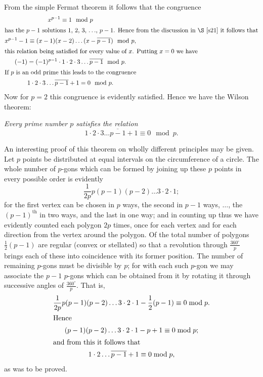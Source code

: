 \documentclass[oneside]{book}
\begin{document}
From the simple Fermat theorem it follows that the congruence
\begin{gather*}
x^{p-1} \equiv 1\mod p \\
\intertext{has the $p-1$ solutions $1$, $2$, $3$, $\ldots$, $p-1$.
Hence from the discussion in \S \ref{s21} it follows that}
x^{p-1}-1 \equiv (x-1)(x-2)\ldots(x-\overline{p-1}) \mod p, \\
\intertext{this relation being satisfied for every value of $x$.
Putting $x = 0$ we have}
(-1) = (-1)^{p - 1}\cdot 1\cdot 2\cdot 3 \ldots
           \overline{p-1}\mod p.  \\
\intertext{If $p$ is an odd prime this leads to the congruence}
1 \cdot 2 \cdot 3 \ldots \overline{p-1} + 1 = 0 \mod p.
\end{gather*}
Now for $p = 2$ this congruence is evidently satisfied. Hence
we have the Wilson theorem:

\smallskip \emph{Every prime number $p$ satisfies the relation}
\begin{equation*}
1 \cdot 2 \cdot 3 \ldots \overline{p-1} + 1 \equiv 0 \mod p.
\end{equation*}

An interesting proof of this theorem on wholly different principles
may be given. Let $p$ points be distributed at equal intervals on
the circumference of a circle. The whole number of $p$-gons which
can be formed by joining up these $p$ points in every possible order
is evidently
\begin{equation*}
\frac{1}{2p} p (p-1) (p-2) \ldots 3 \cdot 2 \cdot 1;
\end{equation*}
for the first vertex can be chosen in $p$ ways, the second in $p -
1$ ways, $\ldots$, the $(p-1)^{\mathrm{th}}$ in two ways, and the
last in one way; and in counting up thus we have evidently counted
each polygon $2p$ times, once for each vertex and for each direction
from the vertex around the polygon. Of the total number of polygons
$\frac{1}{2}(p-1)$ are regular (convex or stellated) so that a
revolution through $\frac{360^\circ}{p}$ brings each of these into
coincidence with its former position. The number of remaining
$p$-gons must be divisible by $p$; for with each such $p$-gon we may
associate the $p-1$ $p$-gons which can be obtained from it by
rotating it through successive angles of $\frac{360^\circ}{p}$. That
is,
\begin{gather*}
\frac{1}{2p} p (p-1) (p-2) \ldots 3 \cdot 2 \cdot 1 -
  \frac 12 (p-1) \equiv 0 \bmod p. \\
\intertext{Hence}
(p-1) (p-2) \ldots 3 \cdot 2 \cdot 1 -  p + 1 \equiv 0 \bmod p; \\
\intertext{and from this it follows that}
1 \cdot 2 \ldots \overline{p-1} + 1 \equiv 0 \bmod p, \\
\end{gather*}
as was to be proved.
\end{document}

